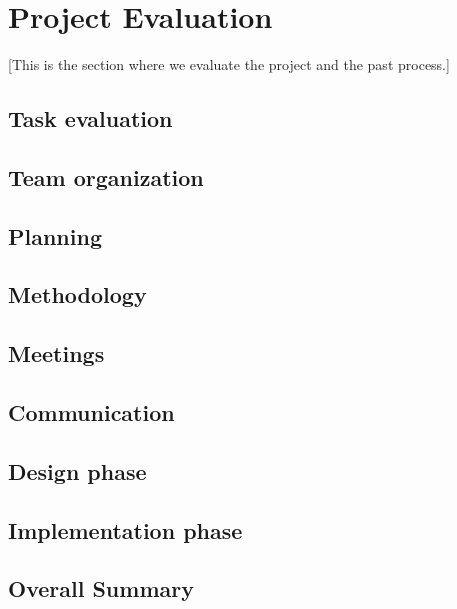 \section{Project Evaluation}\label{Project Evaluation}
    [This is the section where we evaluate the project and the past process.]
    
    \subsection{Task evaluation}
        
    \subsection{Team organization}
        
    \subsection{Planning}
        
    \subsection{Methodology}
        
    \subsection{Meetings}
        
    \subsection{Communication}
        
    \subsection{Design phase}
        
    \subsection{Implementation phase}
        
    \subsection{Overall Summary}    
        




